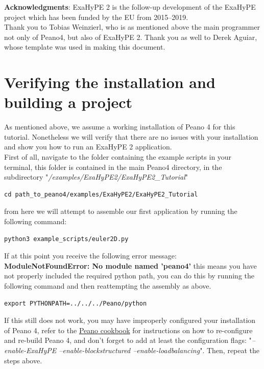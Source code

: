\documentclass[12pt,letterpaper]{article}
\begin{document}
\vspace{\fill}

\textbf{Acknowledgments}:
ExaHyPE 2 is the follow-up development of the ExaHyPE project which has been funded
by the EU from 2015–2019.\\
Thank you to Tobias Weinzierl, who is as mentioned above the main programmer not only of Peano4, but also of ExaHyPE 2. Thank you as well to Derek Aguiar, whose template was used in making this document.


\section{Verifying the installation and building a project}
\label{Verifying_and_building}

\vspace{0.2cm}

As mentioned above, we assume a working installation of Peano 4 for this tutorial. Nonetheless we will verify that there are no issues with your installation and show you how to run an ExaHyPE 2 application.\\
First of all, navigate to the folder containing the example scripts in your terminal, this folder is contained in the main Peano4 directory, in the subdirectory "\textit{/examples/ExaHyPE2/ExaHyPE2\_Tutorial}"\\

\begin{lstlisting}[style = Bash]
cd path_to_peano4/examples/ExaHyPE2/ExaHyPE2_Tutorial
\end{lstlisting}

from here we will attempt to assemble our first application by running the following command:

\begin{lstlisting}[style = Bash]
python3 example_scripts/euler2D.py
\end{lstlisting}

If at this point you receive the following error message:
\textbf{ModuleNotFoundError: No module named 'peano4'} this means you have not properly included the required python path, you can do this by running the following command and then reattempting the assembly as above.

\begin{lstlisting}[style = Bash]
export PYTHONPATH=../../../Peano/python
\end{lstlisting}

If this still does not work, you may have improperly configured your installation of Peano 4, refer to the \hyperlink{http://www.peano-framework.org/peano/p4/cookbook.pdf}{Peano cookbook} for instructions on how to re-configure and re-build Peano 4, and don't forget to add at least the configuration flags: "\textit{--enable-ExaHyPE --enable-blockstructured --enable-loadbalancing}". Then, repeat the steps above.\\
\end{document}
